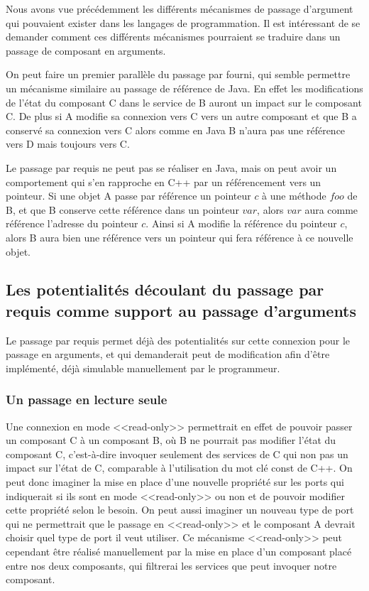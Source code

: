   Nous avons vue précédemment les différents mécanismes de passage d'argument qui pouvaient exister dans les langages de programmation. Il est intéressant de se demander comment ces différents mécanismes pourraient se traduire dans un passage de composant en arguments. 
   
  On peut faire un premier parallèle du passage par fourni, qui semble permettre un mécanisme similaire au passage de référence de Java. En effet les modifications de l'état du composant C dans le service de B auront un impact sur le composant C. De plus si A modifie sa connexion vers C vers un autre composant et que B a conservé sa connexion vers C alors comme en Java B n'aura pas une référence vers D mais toujours vers C.
  
  Le passage par requis ne peut pas se réaliser en Java, mais on peut avoir un comportement qui s'en rapproche en C++ par un référencement vers un pointeur. Si une objet A passe par référence un pointeur $c$ à une méthode $foo$ de B, et que B conserve cette référence dans un pointeur $var$, alors $var$ aura comme référence l'adresse du pointeur $c$. Ainsi si A modifie la référence du pointeur $c$, alors B aura bien une référence vers un pointeur qui fera référence à ce nouvelle objet.
  
  \subsection{Les potentialités découlant du passage par requis comme support au passage d'arguments}

    Le passage par requis permet déjà des potentialités sur cette connexion pour le passage en arguments, et qui demanderait peut de modification afin d'être implémenté, déjà simulable manuellement par le programmeur.  
  
      \subsubsection{Un passage en lecture seule}
    
   Une connexion en mode <<read-only>> permettrait en effet de pouvoir passer un composant C à un composant B, où B ne pourrait pas modifier l'état du composant C, c'est-à-dire invoquer seulement des services de C qui non pas un impact sur l'état de C, comparable à l'utilisation du mot clé const de C++. On peut donc imaginer la mise en place d'une nouvelle propriété sur les ports qui indiquerait si ils sont en mode <<read-only>> ou non et de pouvoir modifier cette propriété selon le besoin. On peut aussi imaginer un nouveau type de port qui ne permettrait que le passage en <<read-only>> et le composant A devrait choisir quel type de port il veut utiliser. Ce mécanisme <<read-only>> peut cependant être réalisé manuellement par la mise en place d'un composant placé entre nos deux composants, qui filtrerai les services que peut invoquer notre composant.
  
